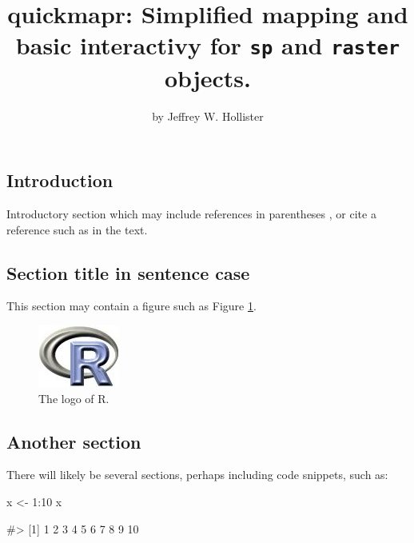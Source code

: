 \title{quickmapr: Simplified mapping and basic interactivy for \texttt{sp} and
\texttt{raster} objects.}
\author{by Jeffrey W. Hollister}

\maketitle


\subsection{Introduction}\label{introduction}

Introductory section which may include references in parentheses
\citep{R}, or cite a reference such as \citet{R} in the text.

\subsection{Section title in sentence
case}\label{section-title-in-sentence-case}

This section may contain a figure such as Figure \ref{figure:rlogo}.

\begin{figure}[htbp]
  \centering
  \includegraphics{Rlogo}
  \caption{The logo of R.}
  \label{figure:rlogo}
\end{figure}

\subsection{Another section}\label{another-section}

There will likely be several sections, perhaps including code snippets,
such as:

\begin{Schunk}
\begin{Sinput}
x <- 1:10
x
\end{Sinput}
\begin{Soutput}
#>  [1]  1  2  3  4  5  6  7  8  9 10
\end{Soutput}
\end{Schunk}

